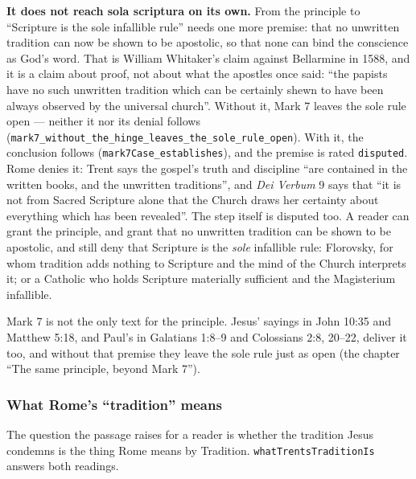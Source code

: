 \documentclass[11pt]{article}
\begin{document}
\textbf{It does not reach sola scriptura on its own.} From the principle to “Scripture is the sole infallible rule” needs one more premise: that no unwritten tradition can now be shown to be apostolic, so that none can bind the conscience as God’s word. That is William Whitaker’s claim against Bellarmine in 1588, and it is a claim about proof, not about what the apostles once said: “the papists have no such unwritten tradition which can be certainly shewn to have been always observed by the universal church”. Without it, Mark 7 leaves the sole rule open — neither it nor its denial follows (\texttt{mark7\_\allowbreak{}without\_\allowbreak{}the\_\allowbreak{}hinge\_\allowbreak{}leaves\_\allowbreak{}the\_\allowbreak{}sole\_\allowbreak{}rule\_\allowbreak{}open}). With it, the conclusion follows (\texttt{mark7\allowbreak{}Case\_\allowbreak{}establishes}), and the premise is rated \texttt{disputed}. Rome denies it: Trent says the gospel’s truth and discipline “are contained in the written books, and the unwritten traditions”, and \emph{Dei Verbum} 9 says that “it is not from Sacred Scripture alone that the Church draws her certainty about everything which has been revealed”. The step itself is disputed too. A reader can grant the principle, and grant that no unwritten tradition can be shown to be apostolic, and still deny that Scripture is the \emph{sole} infallible rule: Florovsky, for whom tradition adds nothing to Scripture and the mind of the Church interprets it; or a Catholic who holds Scripture materially sufficient and the Magisterium infallible.

Mark 7 is not the only text for the principle. Jesus’ sayings in John 10:35 and Matthew 5:18, and Paul’s in Galatians 1:8–9 and Colossians 2:8, 20–22, deliver it too, and without that premise they leave the sole rule just as open (the chapter “The same principle, beyond Mark 7”).

\subsubsection*{What Rome’s “tradition” means}
The question the passage raises for a reader is whether the tradition Jesus condemns is the thing Rome means by Tradition. \texttt{what\allowbreak{}Trents\allowbreak{}Tradition\allowbreak{}Is} answers both readings.
\end{document}
